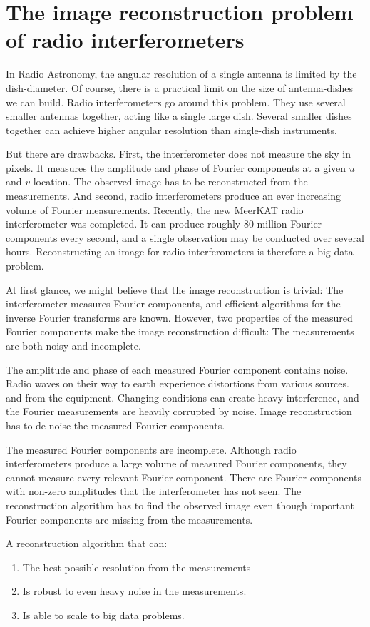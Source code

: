 \section{The image reconstruction problem of radio interferometers}
In Radio Astronomy, the angular resolution of a single antenna is limited by the dish-diameter. Of course, there is a practical limit on the size of antenna-dishes we can build. Radio interferometers go around this problem. They use several smaller antennas together, acting like a single large dish. Several smaller dishes together can achieve higher angular resolution than single-dish instruments.

But there are drawbacks. First, the interferometer does not measure the sky in pixels. It measures the amplitude and phase of Fourier components at a given $u$ and $v$ location. The observed image has to be reconstructed from the measurements. And second, radio interferometers produce an ever increasing volume of Fourier measurements. Recently, the new MeerKAT radio interferometer was completed. It can produce roughly 80 million Fourier components every second, and a single observation may be conducted over several hours. Reconstructing an image for radio interferometers is therefore a big data problem.

At first glance, we might believe that the image reconstruction is trivial: The interferometer measures Fourier components, and efficient algorithms for the inverse Fourier transforms are known. However, two properties of the measured Fourier components make the image reconstruction difficult: The measurements are both noisy and incomplete.

The amplitude and phase of each measured Fourier component contains noise.
Radio waves on their way to earth experience distortions from various sources. and from the equipment. Changing conditions can create heavy interference, and the Fourier measurements are heavily corrupted by noise. Image reconstruction has to de-noise the measured Fourier components.

The measured Fourier components are incomplete. Although radio interferometers produce a large volume of measured Fourier components, they cannot measure every relevant Fourier component. There are Fourier components with non-zero amplitudes that the interferometer has not seen. The reconstruction algorithm has to find the observed image even though important Fourier components are missing from the measurements.

A reconstruction algorithm that can:
\begin{enumerate}
	\item The best possible resolution from the measurements
	\item Is robust to even heavy noise in the measurements.
	\item Is able to scale to big data problems.
\end{enumerate}

